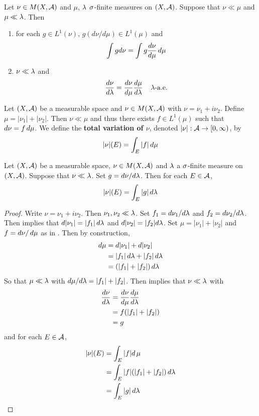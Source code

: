 \documentclass{book}
\begin{document}
	\begin{ex}  
		Let $\nu \in M(X, \mathcal{A})$ and $\mu$, $\lambda$ $\sigma$-finite measures on $(X,\mathcal{A})$. Suppose that $\nu \ll \mu$ and $\mu \ll \lambda$. Then 
		\begin{enumerate}
			\item for each $g \in L^1(\nu)$, $g(d\nu/d\mu) \in  L^1(\mu)$ and $$\int g d\nu = \int g \frac{d\nu}{d\mu} \, d \mu$$
			\item $\nu \ll \lambda$ and $$\frac{d \nu}{d\lambda} = \frac{d \nu}{d\mu} \frac{d\mu}{d\lambda} \hspace{4mm} \lambda \text{-a.e.}$$
		\end{enumerate}
	\end{ex}
	
	\begin{defn} 
	Let $(X,\mathcal{A})$ be a measurable space and $\nu \in M(X,\mathcal{A})$ with $ \nu = \nu_1 + i \nu_2$. Define $\mu = |\nu_1| + |\nu_2|$. Then $\nu \ll \mu$ and thus there exists $f \in L^1(\mu)$ such that $d\nu = f \, d \mu$. We define the \textbf{total variation of $\nu$}, denoted $|\nu|: \mathcal{A} \rightarrow [0,\infty)$, by $$|\nu|(E) = \int_E |f|\, d \mu$$ 
	\end{defn}
	
	\begin{ex}  
	Let $(X,\mathcal{A})$ be a measurable space, $\nu \in M(X,\mathcal{A})$ and $\lambda$ a $\sigma$-finite measure on $(X, \mathcal{A})$. Suppose that $\nu \ll \lambda$. Set $g = d\nu / d\lambda$. Then for each $E \in \mathcal{A}$, $$|\nu|(E) = \int_E |g| \, d \lambda$$
	\end{ex}
	
	\begin{proof}
	Write $\nu = \nu_1 + i \nu_2$. Then $\nu_1, \nu_2 \ll \lambda$. Set $f_1 = d\nu_1 / d\lambda$ and $f_2 = d\nu_2 / d\lambda$. Then  implies that $d|\nu_1| = |f_1| \, d \lambda$ and $d|\nu_2| = |f_2|d\lambda$. Set $\mu = |\nu_1| + |\nu_2|$ and $f = d\nu / \, d \mu$ as in . Then by construction, 
	\begin{align*}
	d\mu
	&= d|\nu_1| + d|\nu_2| \\
	&= |f_1| \, d \lambda + |f_2| \, d \lambda \\
	&= (|f_1| + |f_2|) \, d \lambda
	\end{align*}
	So that $\mu \ll \lambda$ with $d\mu / d \lambda = |f_1| + |f_2|$. Then  implies that $\nu \ll \lambda$ with 
	\begin{align*}
	\frac{d\nu}{d\lambda} 
	&= \frac{d\nu}{d\mu} \frac{d\mu}{d\lambda}\\
	&= f(|f_1|+|f_2|) \\
	&= g
	\end{align*}
	and for each $E \in \mathcal{A}$, 
	\begin{align*}
	|\nu|(E) 
	&= \int_E |f| d \, \mu \\
	&= \int_E |f| (|f_1| + |f_2|) \, d\lambda \\
	&= \int_E|g| \, d\lambda 
	\end{align*}
	\end{proof}
	
\end{document}
